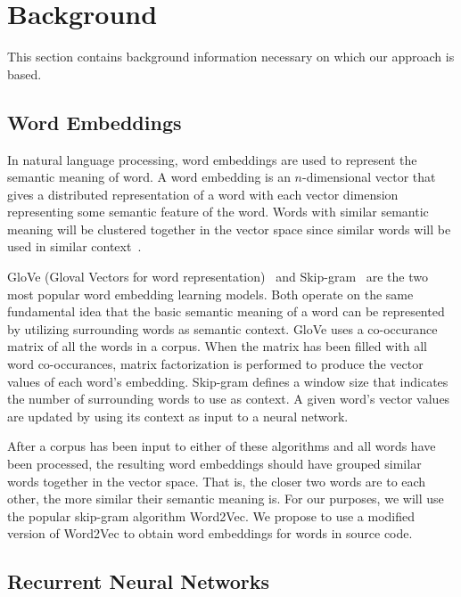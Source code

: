 \section{Background}

This section contains background information necessary on which our approach is based.

\subsection{Word Embeddings}

In natural language processing, word embeddings are used to represent the semantic meaning of word. A word embedding is an $n$-dimensional vector that gives a distributed representation of a word with each vector dimension representing some semantic feature of the word. Words with similar semantic meaning will be clustered together in the vector space since similar words will be used in similar context~\cite{mikolov2013distributed}.

GloVe (Gloval Vectors for word representation)~\cite{pennington2014glove} and Skip-gram~\cite{mikolov2013efficient} are the two most popular word embedding learning models. Both operate on the same fundamental idea that the basic semantic meaning of a word can be represented by utilizing surrounding words as semantic context. GloVe uses a co-occurance matrix of all the words in a corpus. When the matrix has been filled with all word co-occurances, matrix factorization is performed to produce the vector values of each word's embedding. Skip-gram defines a window size that indicates the number of surrounding words to use as context. A given word's vector values are updated by using its context as input to a neural network.

After a corpus has been input to either of these algorithms and all words have been processed, the resulting word embeddings should have grouped similar words together in the vector space. That is, the closer two words are to each other, the more similar their semantic meaning is. For our purposes, we will use the popular skip-gram algorithm Word2Vec. We propose to use a modified version of Word2Vec to obtain word embeddings for words in source code. 
 
\subsection{Recurrent Neural Networks}


